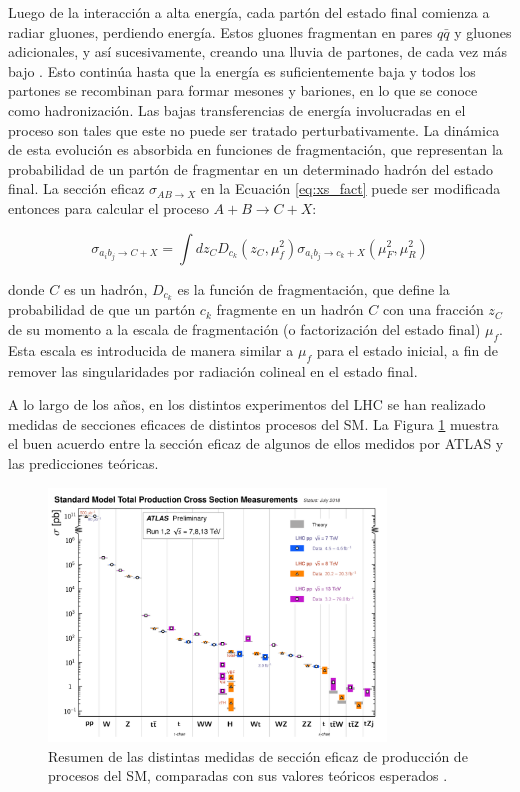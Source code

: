 Luego de la interacción a alta energía, cada partón del estado final comienza a radiar gluones,
perdiendo energía. Estos gluones fragmentan en pares $q\bar{q}$ y gluones adicionales, y así sucesivamente, creando una lluvia de partones, de cada vez más bajo \pt. Esto continúa hasta
que la energía es suficientemente baja y todos los partones se recombinan para formar
mesones y bariones, en lo que se conoce como hadronización. Las bajas transferencias de
energía involucradas en el proceso son tales que este no puede ser tratado perturbativamente. La dinámica de esta evolución es absorbida en funciones de fragmentación, que
representan la probabilidad de un partón de fragmentar en un determinado hadrón del
estado final. La sección eficaz $\sigma_{AB\to X}$ en la Ecuación \ref{eq:xs_fact} puede ser modificada entonces para
calcular el proceso $A + B \to C + X$:

\begin{equation}
	\sigma_{a_i b_j \to C+X} = \int dz_{C} D_{c_k}(z_C, \mu_{f}^2) \sigma_{a_i b_j \to c_k + X}(\mu_{F}^2, \mu_{R}^2)
\end{equation}

\noindent
donde $C$ es un hadrón, $D_{c_k}$ es la función de fragmentación, que define la probabilidad
de que un partón $c_k$ fragmente en un hadrón $C$ con una fracción $z_C$ de su momento a la
escala de fragmentación (o factorización del estado final) $\mu_{f}$. Esta escala es introducida
de manera similar a $\mu_{f}$ para el estado inicial, a fin de remover las singularidades por
radiación colineal en el estado final.

A lo largo de los años, en los distintos experimentos del LHC se han realizado medidas de secciones eficaces de distintos procesos del SM. La Figura \ref{fig:sm_xs} muestra el buen acuerdo entre la sección eficaz de algunos de ellos medidos por ATLAS y las predicciones teóricas.

\begin{figure}
	\centering
  \includegraphics[width=0.8\textwidth]{images/theory/ATLAS_a_SMSummary_TotalXsect.pdf}
  \caption{Resumen de las distintas medidas de sección eficaz de producción de procesos del SM, comparadas con sus valores teóricos esperados \cite{sm_xs}.}
  \label{fig:sm_xs}
\end{figure}







